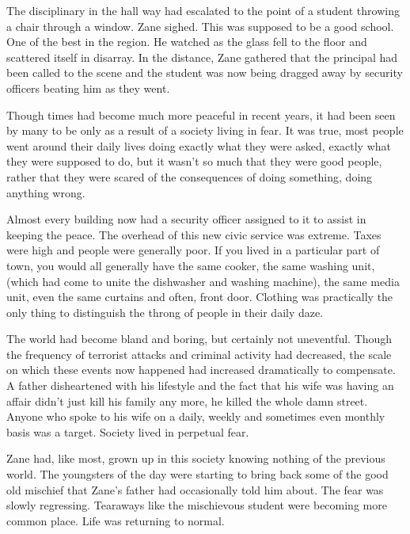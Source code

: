 The disciplinary in the hall way had escalated to the point of a student throwing a chair through a window.  Zane sighed.  This was supposed to be a good school.  One of the best in the region.   He watched as the glass fell to the floor and scattered itself in disarray.  In the distance, Zane gathered that the principal had been called to the scene and the student was now being dragged away by security officers beating him as they went.



\thoughtbreak



Though times had become much more peaceful in recent years, it had been seen by many to be only as a result of a society living in fear.  It was true, most people went around their daily lives doing exactly what they were asked, exactly what they were supposed to do, but it wasn't so much that they were good people, rather that they were scared of the consequences of doing something, doing anything wrong.

Almost every building now had a security officer assigned to it to assist in keeping the peace.  The overhead of this new civic service was extreme.  Taxes were high and people were generally poor.  If you lived in a particular part of town, you would all generally have the same cooker, the same washing unit, (which had come to unite the dishwasher and washing machine), the same media unit, even the same curtains and often, front door.  Clothing was practically the only thing to distinguish the throng of people in their daily daze.

The world had become bland and boring, but certainly not uneventful.  Though the frequency of terrorist attacks and criminal activity had decreased, the scale on which these events now happened had increased dramatically to compensate.  A father disheartened with his lifestyle and the fact that his wife was having an affair didn't just kill his family any more, he killed the whole damn street.  Anyone who spoke to his wife on a daily, weekly and sometimes even monthly basis was a target.  Society lived in perpetual fear.

Zane had, like most, grown up in this society knowing nothing of the previous world.  The youngsters of the day were starting to bring back some of the good old mischief that Zane's father had occasionally told him about.  The fear was slowly regressing.  Tearaways like the mischievous student were becoming more common place.  Life was returning to normal.



